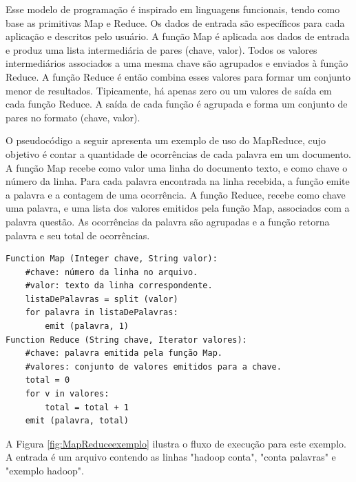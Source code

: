 Esse modelo de programação é inspirado em linguagens funcionais, tendo como base as primitivas Map e Reduce.
Os dados de entrada são específicos para cada aplicação e descritos pelo usuário.
A função Map é aplicada aos dados de entrada e produz uma lista intermediária de pares (chave, valor). Todos os valores intermediários associados a uma mesma chave são agrupados e enviados à função Reduce.
A função Reduce é então
combina esses valores para formar um conjunto menor de resultados.
Tipicamente, há apenas zero ou um valores de saída em cada função Reduce. A saída de cada função é agrupada e forma um conjunto de pares no formato (chave, valor).

O pseudocódigo a seguir apresenta um exemplo de uso do MapReduce, cujo objetivo é contar a quantidade de ocorrências de cada palavra em um documento. A função Map recebe como valor uma linha do documento texto, e como chave o número da linha. Para cada palavra encontrada na linha recebida, a função emite a palavra e a contagem de uma ocorrência. A função Reduce, recebe como chave uma palavra, e uma lista dos valores emitidos pela função Map, associados com a palavra questão. As ocorrências da palavra são agrupadas e a função retorna palavra e seu total de ocorrências.

\begin{lstlisting}[label=some-code,caption=some-code]
Function Map (Integer chave, String valor):
	#chave: número da linha no arquivo.
	#valor: texto da linha correspondente.
	listaDePalavras = split (valor)
	for palavra in listaDePalavras:
		emit (palavra, 1)
Function Reduce (String chave, Iterator valores):
	#chave: palavra emitida pela função Map.
	#valores: conjunto de valores emitidos para a chave.
	total = 0
	for v in valores:
		total = total + 1
	emit (palavra, total)
\end{lstlisting}

A Figura \ref{fig:MapReduceexemplo} ilustra o fluxo de execução para este exemplo. A entrada é um arquivo contendo as linhas "hadoop conta", "conta palavras" e "exemplo hadoop".

